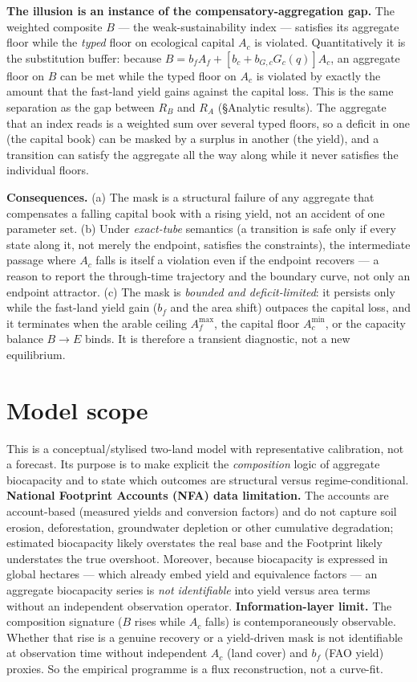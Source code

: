 \documentclass[11pt]{article}
\begin{document}
\noindent\textbf{The illusion is an instance of the compensatory-aggregation gap.} The weighted composite $B$ --- the weak-sustainability index --- satisfies its aggregate floor while the \emph{typed} floor on ecological capital $A_c$ is violated. Quantitatively it is the substitution buffer: because $B=b_fA_f+[b_c+b_{G,c}G_c(q)]A_c$, an aggregate floor on $B$ can be met while the typed floor on $A_c$ is violated by exactly the amount that the fast-land yield gains against the capital loss. This is the same separation as the gap between $R_B$ and $R_A$ (\S Analytic results). The aggregate that an index reads is a weighted sum over several typed floors, so a deficit in one (the capital book) can be masked by a surplus in another (the yield), and a transition can satisfy the aggregate all the way along while it never satisfies the individual floors.

\noindent\textbf{Consequences.} (a) The mask is a structural failure of any aggregate that compensates a falling capital book with a rising yield, not an accident of one parameter set. (b) Under \emph{exact-tube} semantics (a transition is safe only if every state along it, not merely the endpoint, satisfies the constraints), the intermediate passage where $A_c$ falls is itself a violation even if the endpoint recovers --- a reason to report the through-time trajectory and the boundary curve, not only an endpoint attractor. (c) The mask is \emph{bounded and deficit-limited}: it persists only while the fast-land yield gain ($b_f$ and the area shift) outpaces the capital loss, and it terminates when the arable ceiling $A_f^{\max}$, the capital floor $A_c^{\min}$, or the capacity balance $B\to E$ binds. It is therefore a transient diagnostic, not a new equilibrium.

\section{Model scope}

This is a conceptual/stylised two-land model with representative calibration, not a forecast. Its purpose is to make explicit the \emph{composition} logic of aggregate biocapacity and to state which outcomes are structural versus regime-conditional. \textbf{National Footprint Accounts (NFA) data limitation.} The accounts are account-based (measured yields and conversion factors) and do not capture soil erosion, deforestation, groundwater depletion or other cumulative degradation; estimated biocapacity likely overstates the real base and the Footprint likely understates the true overshoot. Moreover, because biocapacity is expressed in global hectares --- which already embed yield and equivalence factors --- an aggregate biocapacity series is \emph{not identifiable} into yield versus area terms without an independent observation operator. \textbf{Information-layer limit.} The composition signature ($B$ rises while $A_c$ falls) is contemporaneously observable. Whether that rise is a genuine recovery or a yield-driven mask is not identifiable at observation time without independent $A_c$ (land cover) and $b_f$ (FAO yield) proxies. So the empirical programme is a flux reconstruction, not a curve-fit.
\end{document}
